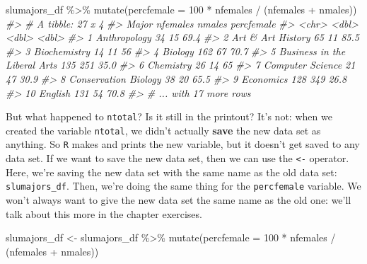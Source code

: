 \documentclass[
]{book}
\newenvironment{Shaded}{\begin{snugshade}}{\end{snugshade}}
\newcommand{\AttributeTok}[1]{\textcolor[rgb]{0.77,0.63,0.00}{#1}}
\newcommand{\CommentTok}[1]{\textcolor[rgb]{0.56,0.35,0.01}{\textit{#1}}}
\newcommand{\DecValTok}[1]{\textcolor[rgb]{0.00,0.00,0.81}{#1}}
\newcommand{\FunctionTok}[1]{\textcolor[rgb]{0.00,0.00,0.00}{#1}}
\newcommand{\NormalTok}[1]{#1}
\newcommand{\OtherTok}[1]{\textcolor[rgb]{0.56,0.35,0.01}{#1}}
\newcommand{\SpecialCharTok}[1]{\textcolor[rgb]{0.00,0.00,0.00}{#1}}
\begin{document}
\begin{Shaded}
\begin{Highlighting}[]
\NormalTok{slumajors\_df }\SpecialCharTok{\%\textgreater{}\%}
  \FunctionTok{mutate}\NormalTok{(}\AttributeTok{percfemale =} \DecValTok{100} \SpecialCharTok{*}\NormalTok{ nfemales }\SpecialCharTok{/}\NormalTok{ (nfemales }\SpecialCharTok{+}\NormalTok{ nmales))}
\CommentTok{\#\textgreater{} \# A tibble: 27 x 4}
\CommentTok{\#\textgreater{}    Major                        nfemales nmales percfemale}
\CommentTok{\#\textgreater{}    \textless{}chr\textgreater{}                           \textless{}dbl\textgreater{}  \textless{}dbl\textgreater{}      \textless{}dbl\textgreater{}}
\CommentTok{\#\textgreater{}  1 Anthropology                       34     15       69.4}
\CommentTok{\#\textgreater{}  2 Art \& Art History                  65     11       85.5}
\CommentTok{\#\textgreater{}  3 Biochemistry                       14     11       56  }
\CommentTok{\#\textgreater{}  4 Biology                           162     67       70.7}
\CommentTok{\#\textgreater{}  5 Business in the Liberal Arts      135    251       35.0}
\CommentTok{\#\textgreater{}  6 Chemistry                          26     14       65  }
\CommentTok{\#\textgreater{}  7 Computer Science                   21     47       30.9}
\CommentTok{\#\textgreater{}  8 Conservation Biology               38     20       65.5}
\CommentTok{\#\textgreater{}  9 Economics                         128    349       26.8}
\CommentTok{\#\textgreater{} 10 English                           131     54       70.8}
\CommentTok{\#\textgreater{} \# ... with 17 more rows}
\end{Highlighting}
\end{Shaded}

But what happened to \texttt{ntotal}? Is it still in the printout? It's not: when we created the variable \texttt{ntotal}, we didn't actually \textbf{save} the new data set as anything. So \texttt{R} makes and prints the new variable, but it doesn't get saved to any data set. If we want to save the new data set, then we can use the \texttt{\textless{}-} operator. Here, we're saving the new data set with the same name as the old data set: \texttt{slumajors\_df}. Then, we're doing the same thing for the \texttt{percfemale} variable. We won't always want to give the new data set the same name as the old one: we'll talk about this more in the chapter exercises.

\begin{Shaded}
\begin{Highlighting}[]
\NormalTok{slumajors\_df }\OtherTok{\textless{}{-}}\NormalTok{ slumajors\_df }\SpecialCharTok{\%\textgreater{}\%}
  \FunctionTok{mutate}\NormalTok{(}\AttributeTok{percfemale =} \DecValTok{100} \SpecialCharTok{*}\NormalTok{ nfemales }\SpecialCharTok{/}\NormalTok{ (nfemales }\SpecialCharTok{+}\NormalTok{ nmales))}
\end{Highlighting}
\end{Shaded}
\end{document}
